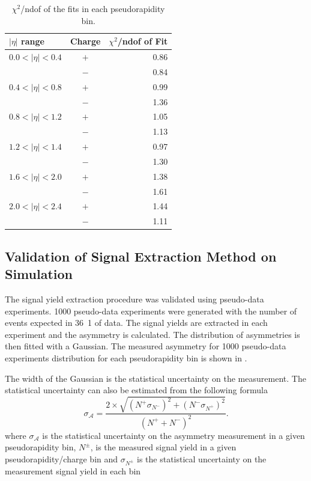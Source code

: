 \begin{table}[htbp]
\begin{center}
\begin{tabular}{lcr}
    \toprule
$|\eta|$ range &Charge & $\chi^2$/ndof of Fit\\
\midrule
$0.0<| \eta |<0.4$ &$+$&  0.86\\
                   &$-$&  0.84\\
$0.4<| \eta |<0.8$ &$+$&  0.99\\
                   &$-$&  1.36\\
$0.8<| \eta |<1.2$ &$+$&  1.05\\
                   &$-$&  1.13\\
$1.2<| \eta |<1.4$ &$+$&  0.97\\
                   &$-$&  1.30\\
$1.6<| \eta |<2.0$ &$+$&  1.38\\
                   &$-$&  1.61\\
$2.0<| \eta |<2.4$ &$+$&  1.44\\
                   &$-$&  1.11\\
    \bottomrule
\end{tabular}
\caption{\label{tab:chi2}$\chi^2$/ndof of the fits in each pseudorapidity bin\cite{baisini2010electron}.}
\end{center}
\end{table}


\subsection{Validation of Signal Extraction Method on Simulation}

The signal yield extraction procedure was validated using pseudo-data
experiments. 1000 pseudo-data experiments were generated with the number of
events expected in \unit{36.1}{\invpb} of data. The signal yields are extracted
in each experiment and the asymmetry is calculated. The distribution of
asymmetries is then fitted with a Gaussian.
The measured asymmetry for 1000 pseudo-data experiments distribution for each
pseudorapidity bin is shown in .

The width of the Gaussian is the statistical uncertainty on the measurement.
The statistical uncertainty can also be estimated from the following formula
\begin{equation}
  \label{tab:statuncert}
\sigma_\mathcal{A} = 
\frac{ 
  2 \times \sqrt{ \left( N^+ \sigma_{N^-} \right)^2 + \left( N^- \sigma_{N^+} \right)^2 } 
}
{ 
  \left( N^{+} + N^{-} \right)^2 
} .
\end{equation}
where $\sigma_\mathcal{A}$ is the statistical uncertainty on the asymmetry
measurement in a given pseudorapidity bin, $N^{\pm}$, is the measured signal
yield in a given pseudorapidity/charge bin and $\sigma_{N^\pm}$ is the
statistical uncertainty on the measurement signal yield in each bin

